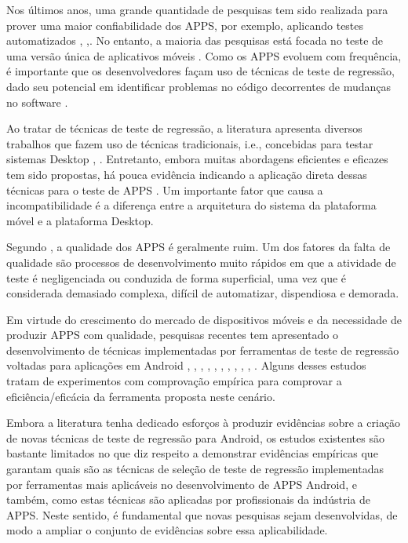 Nos últimos anos, uma grande quantidade de pesquisas tem sido realizada para prover uma maior confiabilidade dos \ac{APPS}, por exemplo, aplicando testes automatizados \cite{7927972}, \cite{8424973},\cite{8453877}. No entanto, a maioria das pesquisas está focada no teste de uma versão única de aplicativos móveis \cite{Do2016RedroidAR}. Como os \ac{APPS} evoluem com frequência, é importante que os desenvolvedores façam uso de técnicas de teste de regressão, dado seu potencial em identificar problemas no código decorrentes de mudanças no software \cite{8377661}.

Ao tratar de técnicas de teste de regressão, a literatura apresenta diversos trabalhos que fazem uso de técnicas tradicionais, i.e., concebidas para testar sistemas Desktop \cite{536955}, \cite{ENGSTROM201014}. Entretanto, embora muitas abordagens eficientes e eficazes tem sido propostas, há pouca evidência indicando a aplicação direta dessas técnicas para o teste de \ac{APPS} \cite{Do2016RedroidAR}. Um importante fator que causa a incompatibilidade é a diferença entre a arquitetura do sistema da plataforma móvel e a plataforma Desktop.

Segundo , a qualidade dos \ac{APPS} é geralmente ruim. Um dos fatores da falta de qualidade são processos de desenvolvimento muito rápidos em que a atividade de teste é negligenciada ou conduzida de forma superficial, uma vez que é considerada demasiado complexa, difícil de automatizar, dispendiosa e demorada. 

Em virtude do crescimento do mercado de dispositivos móveis e da necessidade de produzir \ac{APPS} com qualidade, pesquisas recentes tem apresentado o desenvolvimento de técnicas implementadas por ferramentas de teste de regressão voltadas para aplicações em Android \cite{Do2016RedroidAR}, \cite{Choi:2018:DMA:3180155.3180173}, \cite{8377661}, \cite{5954416}, \cite{7927972}, \cite{8424973}, \cite{6339502}, \cite{6569773}, \cite{7427895}, \cite{7832883}, \cite{7833000}. Alguns desses estudos tratam de experimentos com comprovação empírica para comprovar a eficiência/eficácia da ferramenta proposta neste cenário.

Embora a literatura tenha dedicado esforços à produzir evidências sobre a criação de novas técnicas de teste de regressão para Android, os estudos existentes são bastante limitados no que diz respeito a demonstrar evidências empíricas que garantam quais são as técnicas de seleção de teste de regressão implementadas por ferramentas mais aplicáveis no desenvolvimento de \ac{APPS} Android, e também, como estas técnicas são aplicadas por profissionais da indústria de \ac{APPS}. Neste sentido, é fundamental que novas pesquisas sejam desenvolvidas, de modo a ampliar o conjunto de evidências sobre essa aplicabilidade. 

